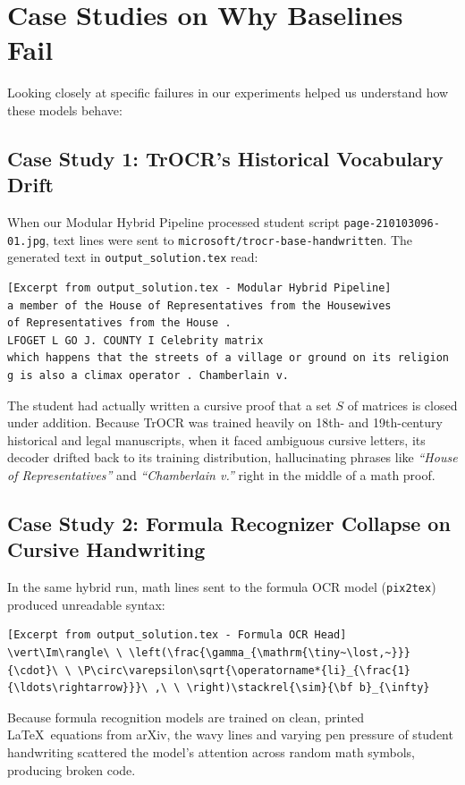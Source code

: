 \section{Case Studies on Why Baselines Fail}
\label{sec:adversarial_analysis}

Looking closely at specific failures in our experiments helped us understand how these models behave:

\subsection{Case Study 1: TrOCR's Historical Vocabulary Drift}
When our Modular Hybrid Pipeline processed student script \texttt{page-210103096-01.jpg}, text lines were sent to \texttt{microsoft/trocr-base-handwritten}. The generated text in \texttt{output\_solution.tex} read:
\begin{verbatim}
[Excerpt from output_solution.tex - Modular Hybrid Pipeline]
a member of the House of Representatives from the Housewives 
of Representatives from the House .
LFOGET L GO J. COUNTY I Celebrity matrix
which happens that the streets of a village or ground on its religion
g is also a climax operator . Chamberlain v.
\end{verbatim}
The student had actually written a cursive proof that a set $S$ of matrices is closed under addition. Because TrOCR was trained heavily on 18th- and 19th-century historical and legal manuscripts, when it faced ambiguous cursive letters, its decoder drifted back to its training distribution, hallucinating phrases like \emph{``House of Representatives''} and \emph{``Chamberlain v.''} right in the middle of a math proof.

\subsection{Case Study 2: Formula Recognizer Collapse on Cursive Handwriting}
In the same hybrid run, math lines sent to the formula OCR model (\texttt{pix2tex}) produced unreadable syntax:
\begin{verbatim}
[Excerpt from output_solution.tex - Formula OCR Head]
\vert\Im\rangle\ \ \left(\frac{\gamma_{\mathrm{\tiny~\lost,~}}}
{\cdot}\ \ \P\circ\varepsilon\sqrt{\operatorname*{li}_{\frac{1}
{\ldots\rightarrow}}}\ ,\ \ \right)\stackrel{\sim}{\bf b}_{\infty}
\end{verbatim}
Because formula recognition models are trained on clean, printed \LaTeX\ equations from arXiv, the wavy lines and varying pen pressure of student handwriting scattered the model's attention across random math symbols, producing broken code.

